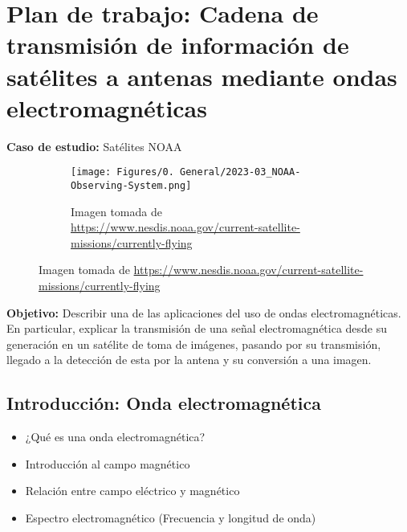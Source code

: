 \section{Plan de trabajo: Cadena de transmisión de información de satélites a antenas mediante ondas electromagnéticas}

\textbf{Caso de estudio:} Satélites NOAA

\begin{figure}[H]
    \centering
    \begin{subfigure}[b]{\textwidth}
        \centering
        \texttt{[image: Figures/0. General/2023-03\_NOAA-Observing-System.png]}
        \caption{Imagen tomada de \url{https://www.nesdis.noaa.gov/current-satellite-missions/currently-flying}}
        \label{fig: NOAA sattelite 1}
    \end{subfigure}
    \hfill
\end{figure}


\textbf{Objetivo:} Describir una de las aplicaciones del uso de ondas electromagnéticas. En particular, explicar la transmisión de una señal electromagnética desde su generación en un satélite de toma de imágenes, pasando por su transmisión, llegado a la detección de esta por la antena y su conversión a una imagen.

\subsection{Introducción: Onda electromagnética}
\begin{itemize}
    \item ¿Qué es una onda electromagnética?
    \item Introducción al campo magnético
    \item Relación entre campo eléctrico y magnético
    \item Espectro electromagnético (Frecuencia y longitud de onda)
\end{itemize}

